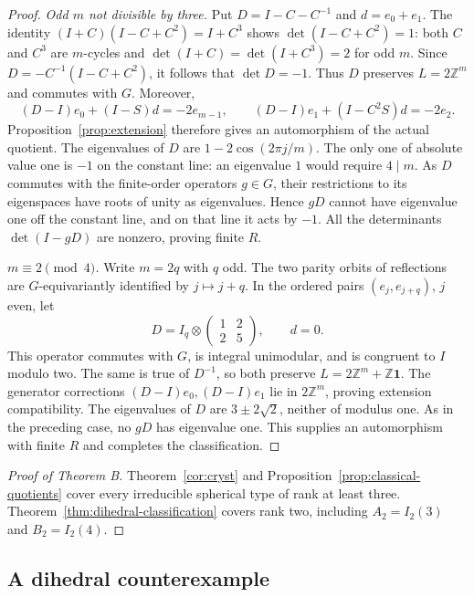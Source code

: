 \documentclass[11pt]{amsart}
\theoremstyle{definition}
\newcommand{\Z}{\mathbb{Z}}
\begin{document}
\begin{proof}
\emph{Odd $m$ not divisible by three.} Put $D=I-C-C^{-1}$ and $d=e_0+e_1$.
The identity $(I+C)(I-C+C^2)=I+C^3$ shows $\det(I-C+C^2)=1$:
both $C$ and $C^3$ are $m$-cycles and $\det(I+C)=\det(I+C^3)=2$ for odd $m$.
Since $D=-C^{-1}(I-C+C^2)$, it follows that $\det D=-1$.
Thus $D$ preserves $L=2\Z^m$ and commutes with $G$. Moreover,
\[
 (D-I)e_0+(I-S)d=-2e_{m-1},\qquad
 (D-I)e_1+(I-C^2S)d=-2e_2.
\]
Proposition~\ref{prop:extension} therefore gives an automorphism of the actual quotient.
The eigenvalues of $D$ are $1-2\cos(2\pi j/m)$. The only one of absolute value one is $-1$ on
the constant line: an eigenvalue $1$ would require $4\mid m$.
As $D$ commutes with the finite-order operators $g\in G$, their restrictions to its eigenspaces have
roots of unity as eigenvalues. Hence $gD$ cannot have eigenvalue one off the constant line, and on that
line it acts by $-1$. All the determinants $\det(I-gD)$ are nonzero, proving finite $R$.

\emph{$m\equiv2\pmod4$.} Write $m=2q$ with $q$ odd. The two parity orbits of reflections are
$G$-equivariantly identified by $j\mapsto j+q$. In the ordered pairs $(e_j,e_{j+q})$, $j$ even, let
\[
 D=I_q\otimes\begin{pmatrix}1&2\\2&5\end{pmatrix},\qquad d=0.
\]
This operator commutes with $G$, is integral unimodular, and is congruent to $I$ modulo two.
The same is true of $D^{-1}$, so both preserve $L=2\Z^m+\Z\mathbf1$.
The generator corrections $(D-I)e_0,(D-I)e_1$ lie in $2\Z^m$, proving extension compatibility.
The eigenvalues of $D$ are $3\pm2\sqrt2$, neither of modulus one. As in the preceding case, no $gD$
has eigenvalue one. This supplies an automorphism with finite $R$ and completes the classification.
\end{proof}

\begin{proof}[Proof of Theorem B]
Theorem~\ref{cor:cryst} and Proposition~\ref{prop:classical-quotients} cover every irreducible spherical
type of rank at least three. Theorem~\ref{thm:dihedral-classification} covers rank two, including
$A_2=I_2(3)$ and $B_2=I_2(4)$.
\end{proof}



\subsection{A dihedral counterexample}\label{sec:dihedral-counterexample}
\end{document}
